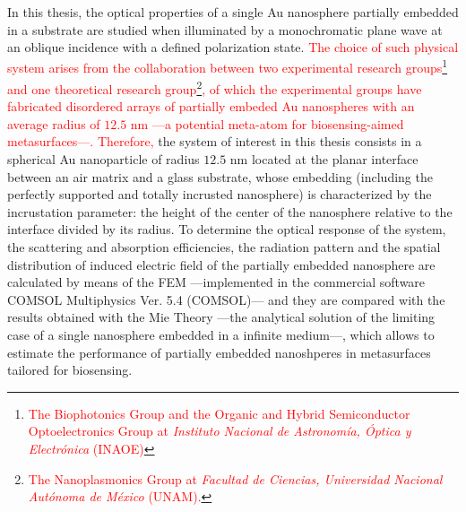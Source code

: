 In this thesis, the optical properties of a single Au nanosphere partially embedded in a substrate are studied when illuminated by a monochromatic plane wave at an oblique incidence with a defined polarization state. \textcolor{red}{The choice of such physical system arises from the collaboration between two experimental research groups\footnote{\textcolor{red}{The Biophotonics Group and the Organic and Hybrid Semiconductor Optoelectronics Group at \textit{Instituto Nacional de Astronomía, Óptica y Electrónica} (INAOE)}} and one theoretical research group\footnote{\textcolor{red}{The Nanoplasmonics Group at \textit{Facultad de Ciencias, Universidad Nacional Autónoma de México} (UNAM).}}, of which the experimental groups have fabricated disordered arrays of partially embeded Au nanospheres with an average radius of $12.5$ nm ---a potential meta-atom for biosensing-aimed metasurfaces---. Therefore,} the system of interest in this thesis consists in a spherical Au nanoparticle of radius $12.5$ nm located at the planar interface between an air matrix and a glass substrate, whose embedding (including the perfectly supported and totally incrusted nanosphere) is characterized by the incrustation parameter: the height of the center of the nanosphere relative to the interface divided by its radius. To determine the optical response of the system, the scattering and absorption efficiencies, the radiation pattern and the spatial distribution of induced electric field of the partially embedded nanosphere are calculated by means of the FEM ---implemented in the commercial software COMSOL Multiphysics\texttrademark{} Ver. 5.4 (COMSOL)--- and they are compared with the results obtained with the Mie Theory ---the analytical solution of the limiting case of a single nanosphere embedded in a infinite medium---, which allows to estimate the performance of partially embedded nanoshperes in metasurfaces tailored for biosensing.

